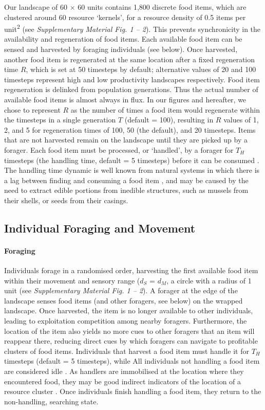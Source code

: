 Our landscape of 60 $\times$ 60 units contains 1,800 discrete food items, which are clustered around 60 resource `kernels', for a resource density of 0.5 items per unit\textsuperscript{2} (see \textit{Supplementary Material Fig. 1 -- 2}).
This prevents synchronicity in the availability and regeneration of food items.
Each available food item can be sensed and harvested by foraging individuals (see below).
Once harvested, another food item is regenerated at the same location after a fixed regeneration time $R$, which is set at 50 timesteps by default; alternative values of 20 and 100 timesteps represent high and low productivity landscapes respectively.
Food item regeneration is delinked from population generations.
Thus the actual number of available food items is almost always in flux.
In our figures and hereafter, we chose to represent $R$ as the number of times a food item would regenerate within the timesteps in a single generation $T$ (default = 100), resulting in $R$ values of 1, 2, and 5 for regeneration times of 100, 50 (the default), and 20 timesteps.
Items that are not harvested remain on the landscape until they are picked up by a forager.
Each food item must be processed, or `handled', by a forager for $T_H$ timesteps (the handling time, default = 5 timesteps) before it can be consumed \citep{ruxton1992,gupte2021a}.
The handling time dynamic is well known from natural systems in which there is a lag between finding and consuming a food item \citep{ruxton1992}, and may be caused by the need to extract edible portions from inedible structures, such as mussels from their shells, or seeds from their casings.

\subsection*{Individual Foraging and Movement}

\paragraph*{Foraging} Individuals forage in a randomised order, harvesting the first available food item within their movement and sensory range ($d_S$ = $d_M$, a circle with a radius of 1 unit (see \textit{Supplementary Material Fig. 1 -- 2}).
A forager at the edge of the landscape senses food items (and other foragers, see below) on the wrapped landscape.
Once harvested, the item is no longer available to other individuals, leading to exploitation competition among nearby foragers.
Furthermore, the location of the item also yields no more cues to other foragers that an item will reappear there, reducing direct cues by which foragers can navigate to profitable clusters of food items.
Individuals that harvest a food item must handle it for $T_H$ timesteps (default = 5 timesteps), while 
All individuals not handling a food item are considered idle \citep{ruxton1992,gupte2021a}.
As handlers are immobilised at the location where they encountered food, they may be good indirect indicators of the location of a resource cluster \cite[`social information'][]{danchin2004,romano2020,gupte2021a}.
Once individuals finish handling a food item, they return to the non-handling, searching state.

